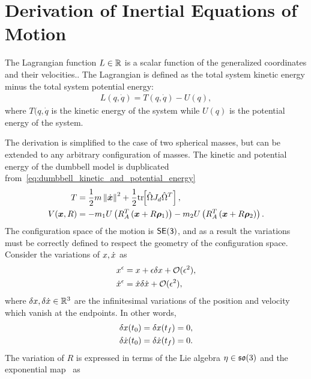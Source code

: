 
\chapter{Derivation of Inertial Equations of Motion}\label{proof:inertial_dumbbell_eoms}
The Lagrangian function \( L \in \mathbb{R} \) is a scalar function of the generalized coordinates and their velocities..
The Lagrangian is defined as the total system kinetic energy minus the total system potential energy:
\begin{align*}
    L(q, \dot{q} ) = T(q, \dot{q}) - U (q) ,
\end{align*}
where \( T(q, \dot{q} \) is the kinetic energy of the system while \( U(q) \) is the potential energy of the system.

The derivation is simplified to the case of two spherical masses, but can be extended to any arbitrary configuration of masses.
The kinetic and potential energy of the dumbbell model is dupblicated from~\cref{eq:dumbbell_kinetic_and_potential_energy} 
\begin{align*}
    T &= \frac{1}{2} m \left\| \dot{\bm{x}} \right\|^2 + \frac{1}{2} \mathrm{tr}\negthickspace\left[ \hat{\Omega} J_d \hat{\Omega}^T \right] , \\
    V( \bm{x}, R ) &=  - m_1 U \left( R_A^T \left( \bm{x} + R \bm{\rho}_1 \right) \right) - m_2 U \left( R_A^T \left( \bm{x} + R \bm{\rho}_2 \right) \right) .
\end{align*}
The configuration space of the motion is \( \mathsf{SE(3)} \), and as a result the variations must be correctly defined to respect the geometry of the configuration space.
Consider the variations of \( x, \dot{x} \) as
\begin{align}
    x^\epsilon &= x + \epsilon \delta x + \mathcal{O}(\epsilon^2), \label{eq:inertial_pos_variation} \\
    \dot{x}^\epsilon &= \dot{x} \delta \dot{x} + \mathcal{O}(\epsilon^2), \label{eq:inertial_vel_variation}
\end{align}
where \( \delta x, \delta \dot{x} \in \mathbb{R}^3 \) are the infinitesimal variations of the position and velocity which vanish at the endpoints.
In other words,
\begin{align*}
    \delta x (t_0) &= \delta x (t_f ) = 0, \\
    \delta \dot{x} (t_0) &= \delta \dot{x} (t_f) = 0 .
\end{align*}
The variation of \( R \) is expressed in terms of the Lie algebra \( \eta \in \mathfrak{so}(3) \) and the exponential map~\cite{hall2015} as
